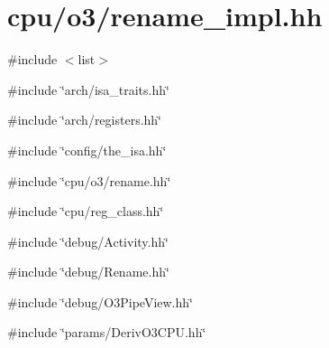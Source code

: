 \hypertarget{rename__impl_8hh}{
\section{cpu/o3/rename\_\-impl.hh}
\label{rename__impl_8hh}
}
{\ttfamily \#include $<$list$>$}\par
{\ttfamily \#include \char`\"{}arch/isa\_\-traits.hh\char`\"{}}\par
{\ttfamily \#include \char`\"{}arch/registers.hh\char`\"{}}\par
{\ttfamily \#include \char`\"{}config/the\_\-isa.hh\char`\"{}}\par
{\ttfamily \#include \char`\"{}cpu/o3/rename.hh\char`\"{}}\par
{\ttfamily \#include \char`\"{}cpu/reg\_\-class.hh\char`\"{}}\par
{\ttfamily \#include \char`\"{}debug/Activity.hh\char`\"{}}\par
{\ttfamily \#include \char`\"{}debug/Rename.hh\char`\"{}}\par
{\ttfamily \#include \char`\"{}debug/O3PipeView.hh\char`\"{}}\par
{\ttfamily \#include \char`\"{}params/DerivO3CPU.hh\char`\"{}}\par
